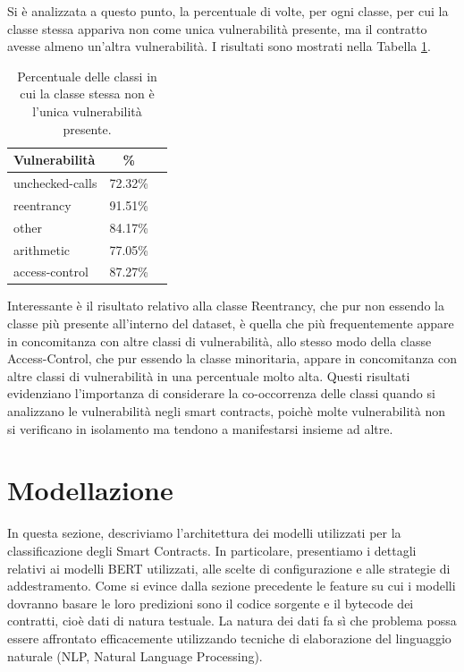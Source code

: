 \documentclass[../../Thesis.tex]{subfiles}
\begin{document}
Si \`e analizzata a questo punto, la percentuale di volte, per ogni classe, per cui la classe stessa appariva non come unica vulnerabilit\`a presente, ma il contratto avesse almeno un'altra vulnerabilit\`a. I risultati sono mostrati nella Tabella \ref{tab:multi_vuln}.

\begin{table}[h!]
    \centering
    \begin{tabular}{|l|c|c|}
        \hline
        \textbf{Vulnerabilit\`a} & \textbf{\%} \\
        \hline
        unchecked-calls  & 72.32\% \\
        reentrancy  & 91.51\% \\
        other  & 84.17\% \\
        arithmetic  & 77.05\% \\
        access-control  & 87.27\% \\

        \hline
    \end{tabular}
    \caption{Percentuale delle classi in cui la classe stessa non \`e l'unica vulnerabilit\`a presente.}
    \label{tab:multi_vuln}
\end{table}
Interessante \`e il risultato relativo alla classe Reentrancy, che pur non essendo la classe pi\`u presente all'interno del dataset, \`e quella che pi\`u frequentemente appare in concomitanza con altre classi di vulnerabilit\`a, allo stesso modo della classe Access-Control, che pur essendo la classe minoritaria, appare in concomitanza con altre classi di vulnerabilit\`a in una percentuale molto alta.
Questi risultati evidenziano l'importanza di considerare la co-occorrenza delle classi quando si analizzano le vulnerabilit\`a negli smart contracts, poich\`e molte vulnerabilit\`a non si verificano in isolamento ma tendono a manifestarsi insieme ad altre.


\section{Modellazione}
In questa sezione, descriviamo l'architettura dei modelli utilizzati per la classificazione degli Smart Contracts. In particolare, presentiamo i dettagli relativi ai modelli BERT utilizzati, alle scelte di configurazione e alle strategie di addestramento.
Come si evince dalla sezione precedente le feature su cui i modelli dovranno basare le loro predizioni sono il codice sorgente e il bytecode dei contratti, cio\`e dati di natura testuale. La natura dei dati fa s\`i che problema possa essere affrontato efficacemente utilizzando tecniche di elaborazione del linguaggio naturale (NLP, Natural Language Processing).
\end{document}
